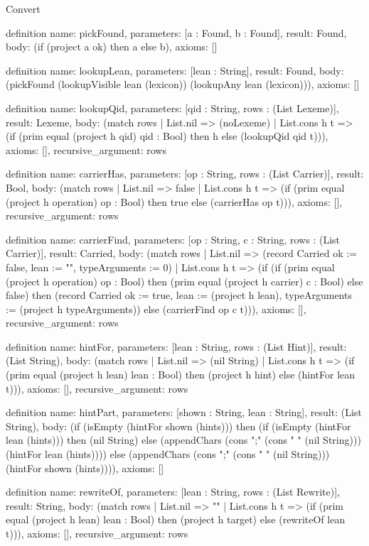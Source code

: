 \begin{lexlean}{Convert}
\begin{semanticmodule}
definition{
  name: pickFound,
  parameters: [a : Found, b : Found],
  result: Found,
  body: (if (project a ok) then a else b),
  axioms: []
}

definition{
  name: lookupLean,
  parameters: [lean : String],
  result: Found,
  body: (pickFound (lookupVisible lean (lexicon)) (lookupAny lean (lexicon))),
  axioms: []
}

definition{
  name: lookupQid,
  parameters: [qid : String, rows : (List Lexeme)],
  result: Lexeme,
  body: (match rows
    | List.nil => (noLexeme)
    | List.cons h t => (if (prim equal (project h qid) qid : Bool) then h else (lookupQid qid t))),
  axioms: [],
  recursive_argument: rows
}

definition{
  name: carrierHas,
  parameters: [op : String, rows : (List Carrier)],
  result: Bool,
  body: (match rows
    | List.nil => false
    | List.cons h t => (if (prim equal (project h operation) op : Bool) then true else (carrierHas op t))),
  axioms: [],
  recursive_argument: rows
}

definition{
  name: carrierFind,
  parameters: [op : String, c : String, rows : (List Carrier)],
  result: Carried,
  body: (match rows
    | List.nil => (record Carried {ok := false, lean := "", typeArguments := 0})
    | List.cons h t => (if (if (prim equal (project h operation) op : Bool) then (prim equal (project h carrier) c : Bool) else false) then (record Carried {ok := true, lean := (project h lean), typeArguments := (project h typeArguments)}) else (carrierFind op c t))),
  axioms: [],
  recursive_argument: rows
}

definition{
  name: hintFor,
  parameters: [lean : String, rows : (List Hint)],
  result: (List String),
  body: (match rows
    | List.nil => (nil String)
    | List.cons h t => (if (prim equal (project h lean) lean : Bool) then (project h hint) else (hintFor lean t))),
  axioms: [],
  recursive_argument: rows
}

definition{
  name: hintPart,
  parameters: [shown : String, lean : String],
  result: (List String),
  body: (if (isEmpty (hintFor shown (hints))) then (if (isEmpty (hintFor lean (hints))) then (nil String) else (appendChars (cons ";" (cons " " (nil String))) (hintFor lean (hints)))) else (appendChars (cons ";" (cons " " (nil String))) (hintFor shown (hints)))),
  axioms: []
}

definition{
  name: rewriteOf,
  parameters: [lean : String, rows : (List Rewrite)],
  result: String,
  body: (match rows
    | List.nil => ""
    | List.cons h t => (if (prim equal (project h lean) lean : Bool) then (project h target) else (rewriteOf lean t))),
  axioms: [],
  recursive_argument: rows
}


\end{semanticmodule}
\end{lexlean}
